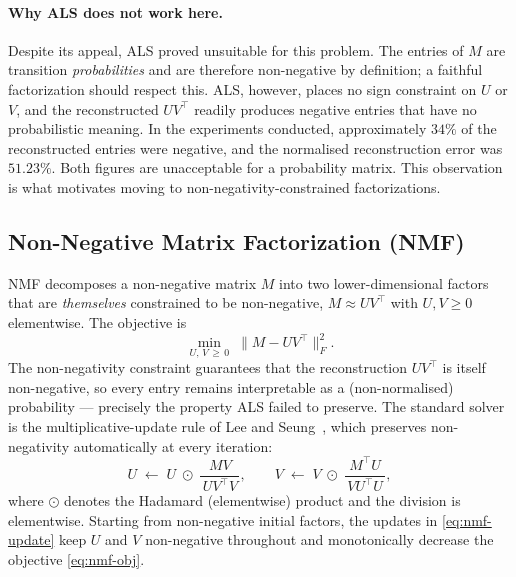\paragraph{Why ALS does not work here.}
Despite its appeal, ALS proved unsuitable for this problem. The entries of $M$
are transition \emph{probabilities} and are therefore non-negative by
definition; a faithful factorization should respect this. ALS, however, places
no sign constraint on $U$ or $V$, and the reconstructed $UV^{\top}$ readily
produces negative entries that have no probabilistic meaning. In the
experiments conducted, approximately $34\%$ of the reconstructed entries were
negative, and the normalised reconstruction error was $51.23\%$. Both figures
are unacceptable for a probability matrix. This observation is what motivates
moving to non-negativity-constrained factorizations.

\subsection{Non-Negative Matrix Factorization (NMF)}
\label{sec:nmf}
NMF decomposes a non-negative matrix $M$ into two lower-dimensional factors
that are \emph{themselves} constrained to be non-negative,
$M \approx U V^{\top}$ with $U, V \ge 0$ elementwise. The objective is
\begin{equation}
  \label{eq:nmf-obj}
  \min_{U,\,V \,\ge\, 0}\;
    \bigl\| M - U V^{\top} \bigr\|_{F}^{2}.
\end{equation}
The non-negativity constraint guarantees that the reconstruction
$U V^{\top}$ is itself non-negative, so every entry remains interpretable as a
(non-normalised) probability --- precisely the property ALS failed to
preserve. The standard solver is the multiplicative-update rule of Lee and
Seung~\cite{LeeSeung01}, which preserves non-negativity automatically at every
iteration:
\begin{equation}
  \label{eq:nmf-update}
  U \;\leftarrow\; U \;\odot\; \frac{M V}{\,U V^{\top} V\,},
  \qquad
  V \;\leftarrow\; V \;\odot\; \frac{M^{\top} U}{\,V U^{\top} U\,},
\end{equation}
where $\odot$ denotes the Hadamard (elementwise) product and the division is
elementwise. Starting from non-negative initial factors, the updates in
\eqref{eq:nmf-update} keep $U$ and $V$ non-negative throughout and
monotonically decrease the objective \eqref{eq:nmf-obj}.

